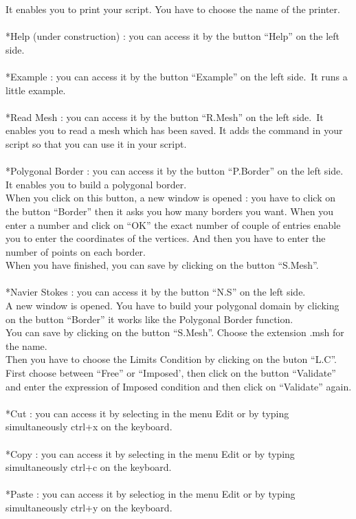 It enables you to print your script. You have to choose the name of the printer.\\
\\
*Help (under construction) : you can access it by the button ``Help'' on the left side.\\
\\
*Example : you can access it by the button ``Example'' on the left side.\
It runs a little example.\\
\\
*Read Mesh : you can access it by the button ``R.Mesh'' on the left side.\
It enables you to read a mesh which has been saved. It adds the command in your script so that you can use it in your script.\\
\\
*Polygonal Border : you can access it by the button ``P.Border'' on the left side.\\
It enables you to build a polygonal border.\\
When you click on this button, a new window is opened : you have to click on the button ``Border'' then it asks you how many borders you want. When you enter a number and click on ``OK'' the exact number of couple of entries enable you to enter the coordinates of the vertices. And then you have to enter the number of points on each border.\\
When you have finished, you can save by clicking on the button ``S.Mesh''.\\
\\
*Navier Stokes : you can access it by the button ``N.S'' on the left side.\\
A new window is opened. You have to build your polygonal domain by clicking on the button ``Border'' it works like the Polygonal Border function.\\
You can save by clicking on the button ``S.Mesh''. Choose the extension .msh for the name.\\
Then you have to choose the Limits Condition by clicking on the buton ``L.C''.\\
First choose between ``Free'' or ``Imposed', then click on the button ``Validate'' and enter the expression of Imposed condition and then click on ``Validate'' again.\\
\\
*Cut : you can access it by selecting in the menu Edit or by typing simultaneously ctrl+x on the keyboard.\\
\\
*Copy : you can access it by selecting in the menu Edit or by typing simultaneously ctrl+c on the keyboard.\\
\\
*Paste : you can access it by selectiog in the menu Edit or by typing simultaneously ctrl+y on the keyboard.\\

